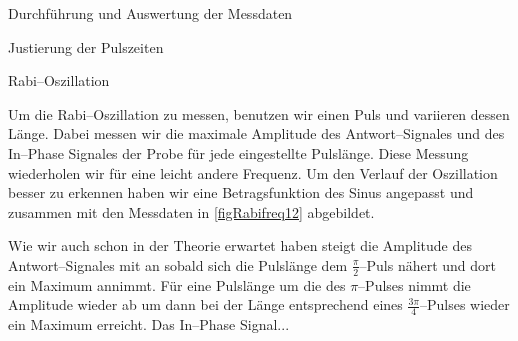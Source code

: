 \documentclass[pdftex, a4paper,11pt, twoside, ngerman]{report}
\begin{document}
\begin{chapter}{Durchführung und Auswertung der Messdaten}
\begin{section}{Justierung der Pulszeiten}
      
    \end{section}
    
    
    
    \begin{section}{Rabi--Oszillation}
      \label{chpRabi}
      
      Um die Rabi--Oszillation zu messen, benutzen wir einen Puls und variieren
      dessen Länge.
      Dabei messen wir die maximale Amplitude des Antwort--Signales und des
      In--Phase Signales der Probe für jede eingestellte Pulslänge.
      Diese Messung wiederholen wir für eine leicht andere Frequenz.
      Um den Verlauf der Oszillation besser zu erkennen haben wir eine
      Betragsfunktion des Sinus angepasst und zusammen mit den Messdaten in
      \cref{figRabifreq12} abgebildet.
      
      Wie wir auch schon in der Theorie erwartet haben steigt die Amplitude
      des Antwort--Signales mit an sobald sich die Pulslänge dem
      $\frac{\pi}{2}$--Puls nähert und dort ein Maximum annimmt.
      Für eine Pulslänge um die des $\pi$--Pulses nimmt die Amplitude wieder
      ab um dann bei der Länge entsprechend eines $\frac{3\pi}{4}$--Pulses
      wieder ein Maximum erreicht.
      Das In--Phase Signal...
      
      
%       
      

\end{section}
\end{chapter}
\end{document}
